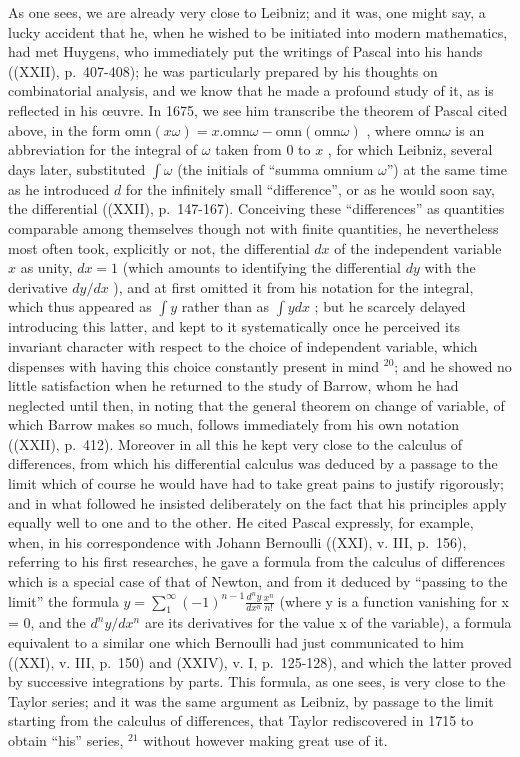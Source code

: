 As one sees, we are already very close to Leibniz; and it was, one might say, a lucky accident that he, when he wished to be initiated into modern mathematics, had met Huygens, who immediately put the writings of Pascal into his hands ((XXII), p.~407-408); he was particularly prepared by his thoughts on combinatorial analysis, and we know that he made a profound study of it, as is reflected in his œuvre. In 1675, we see him transcribe the theorem of Pascal cited above, in the form \(\mathrm{omn}(x\omega) = x.\mathrm{omn}\omega -\mathrm{omn}(\mathrm{omn}\omega)\) , where \(\mathrm{omn}\omega\) is an abbreviation for the integral of \(\omega\) taken from 0 to \(x\) , for which Leibniz, several days later, substituted \(\int \omega\) (the initials of ``summa omnium \(\omega\)'') at the same time as he introduced \(d\) for the infinitely small ``difference'', or as he would soon say, the differential ((XXII), p.~147-167). Conceiving these ``differences'' as quantities comparable among themselves though not with finite quantities, he nevertheless most often took, explicitly or not, the differential \(dx\) of the independent variable \(x\) as unity, \(dx = 1\) (which amounts to identifying the differential \(dy\) with the derivative \(dy / dx\) ), and at first omitted it from his notation for the integral, which thus appeared as \(\int y\) rather than as \(\int ydx\) ; but he scarcely delayed introducing this latter, and kept to it systematically once he perceived its invariant character with respect to the choice of independent variable, which dispenses with having this choice constantly present in mind \({}^{20}\); and he showed no little satisfaction when he returned to the study of Barrow, whom he had neglected until then, in noting that the general theorem on change of variable, of which Barrow makes so much, follows immediately from his own notation ((XXII), p.~412). Moreover in all this he kept very close to the calculus of differences, from which his differential calculus was deduced by a passage to the limit which of course he would have had to take great pains to justify rigorously; and in what followed he insisted deliberately on the fact that his principles apply equally well to one and to the other. He cited Pascal expressly, for example, when, in his correspondence with Johann Bernoulli ((XXI), v. III, p.~156), referring to his first researches, he gave a formula from the calculus of differences which is a special case of that of Newton, and from it deduced by ``passing to the limit'' the formula \(y = \sum_{1}^{\infty} (-1)^{n-1} \frac{d^{n}y}{dx^{n}} \frac{x^{n}}{n!}\) (where y is a function vanishing for x = 0, and the \(d^{n}y/dx^{n}\) are its derivatives for the value x of the variable), a formula equivalent to a similar one which Bernoulli had just communicated to him ((XXI), v. III, p.~150) and (XXIV), v. I, p.~125-128), and which the latter proved by successive integrations by parts. This formula, as one sees, is very close to the Taylor series; and it was the same argument as Leibniz, by passage to the limit starting from the calculus of differences, that Taylor rediscovered in 1715 to obtain ``his'' series, \(^{21}\) without however making great use of it.

